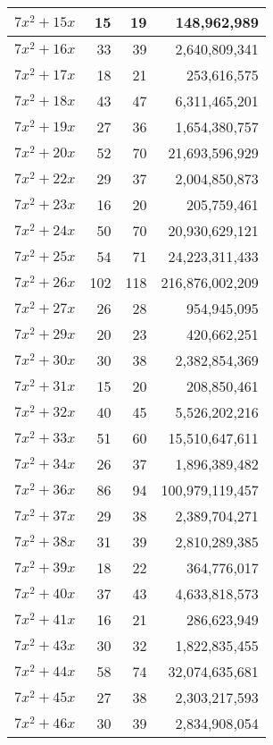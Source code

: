 \documentclass[a4paper]{amsproc}
\theoremstyle{plain}
\theoremstyle{named}
\begin{document}
\begin{longtable}{ | l | r | r | r | }
$7x^2 + 15x$ & 15 & 19 & 148{,}962{,}989 \\ \hline
$7x^2 + 16x$ & 33 & 39 & 2{,}640{,}809{,}341 \\ \hline
$7x^2 + 17x$ & 18 & 21 & 253{,}616{,}575 \\ \hline
$7x^2 + 18x$ & 43 & 47 & 6{,}311{,}465{,}201 \\ \hline
$7x^2 + 19x$ & 27 & 36 & 1{,}654{,}380{,}757 \\ \hline
$7x^2 + 20x$ & 52 & 70 & 21{,}693{,}596{,}929 \\ \hline
$7x^2 + 22x$ & 29 & 37 & 2{,}004{,}850{,}873 \\ \hline
$7x^2 + 23x$ & 16 & 20 & 205{,}759{,}461 \\ \hline
$7x^2 + 24x$ & 50 & 70 & 20{,}930{,}629{,}121 \\ \hline
$7x^2 + 25x$ & 54 & 71 & 24{,}223{,}311{,}433 \\ \hline
$7x^2 + 26x$ & 102 & 118 & 216{,}876{,}002{,}209 \\ \hline
$7x^2 + 27x$ & 26 & 28 & 954{,}945{,}095 \\ \hline
$7x^2 + 29x$ & 20 & 23 & 420{,}662{,}251 \\ \hline
$7x^2 + 30x$ & 30 & 38 & 2{,}382{,}854{,}369 \\ \hline
$7x^2 + 31x$ & 15 & 20 & 208{,}850{,}461 \\ \hline
$7x^2 + 32x$ & 40 & 45 & 5{,}526{,}202{,}216 \\ \hline
$7x^2 + 33x$ & 51 & 60 & 15{,}510{,}647{,}611 \\ \hline
$7x^2 + 34x$ & 26 & 37 & 1{,}896{,}389{,}482 \\ \hline
$7x^2 + 36x$ & 86 & 94 & 100{,}979{,}119{,}457 \\ \hline
$7x^2 + 37x$ & 29 & 38 & 2{,}389{,}704{,}271 \\ \hline
$7x^2 + 38x$ & 31 & 39 & 2{,}810{,}289{,}385 \\ \hline
$7x^2 + 39x$ & 18 & 22 & 364{,}776{,}017 \\ \hline
$7x^2 + 40x$ & 37 & 43 & 4{,}633{,}818{,}573 \\ \hline
$7x^2 + 41x$ & 16 & 21 & 286{,}623{,}949 \\ \hline
$7x^2 + 43x$ & 30 & 32 & 1{,}822{,}835{,}455 \\ \hline
$7x^2 + 44x$ & 58 & 74 & 32{,}074{,}635{,}681 \\ \hline
$7x^2 + 45x$ & 27 & 38 & 2{,}303{,}217{,}593 \\ \hline
$7x^2 + 46x$ & 30 & 39 & 2{,}834{,}908{,}054 \\ \hline

\end{longtable}
\end{document}
